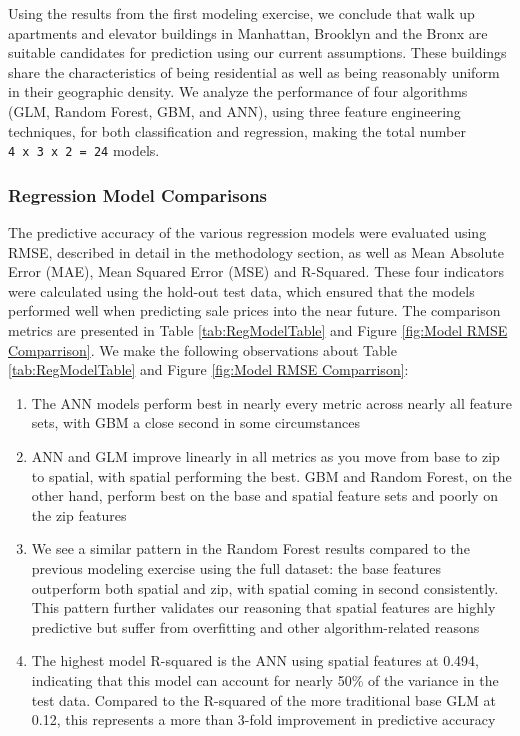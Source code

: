 \documentclass[12pt,]{article}
\providecommand{\tightlist}{%
  \setlength{\itemsep}{0pt}\setlength{\parskip}{0pt}}
\begin{document}
Using the results from the first modeling exercise, we conclude that
walk up apartments and elevator buildings in Manhattan, Brooklyn and the
Bronx are suitable candidates for prediction using our current
assumptions. These buildings share the characteristics of being
residential as well as being reasonably uniform in their geographic
density. We analyze the performance of four algorithms (GLM, Random
Forest, GBM, and ANN), using three feature engineering techniques, for
both classification and regression, making the total number
\texttt{4\ x\ 3\ x\ 2\ =\ 24} models.

\hypertarget{regression-model-comparisons}{%
\subsubsection{Regression Model
Comparisons}\label{regression-model-comparisons}}

The predictive accuracy of the various regression models were evaluated
using RMSE, described in detail in the methodology section, as well as
Mean Absolute Error (MAE), Mean Squared Error (MSE) and R-Squared. These
four indicators were calculated using the hold-out test data, which
ensured that the models performed well when predicting sale prices into
the near future. The comparison metrics are presented in Table
\ref{tab:RegModelTable} and Figure \ref{fig:Model RMSE Comparrison}. We
make the following observations about Table \ref{tab:RegModelTable} and
Figure \ref{fig:Model RMSE Comparrison}:

\begin{enumerate}
\def\labelenumi{\arabic{enumi})}
\tightlist
\item
  The ANN models perform best in nearly every metric across nearly all
  feature sets, with GBM a close second in some circumstances
\item
  ANN and GLM improve linearly in all metrics as you move from base to
  zip to spatial, with spatial performing the best. GBM and Random
  Forest, on the other hand, perform best on the base and spatial
  feature sets and poorly on the zip features
\item
  We see a similar pattern in the Random Forest results compared to the
  previous modeling exercise using the full dataset: the base features
  outperform both spatial and zip, with spatial coming in second
  consistently. This pattern further validates our reasoning that
  spatial features are highly predictive but suffer from overfitting and
  other algorithm-related reasons
\item
  The highest model R-squared is the ANN using spatial features at
  0.494, indicating that this model can account for nearly 50\% of the
  variance in the test data. Compared to the R-squared of the more
  traditional base GLM at 0.12, this represents a more than 3-fold
  improvement in predictive accuracy
\end{enumerate}
\end{document}
